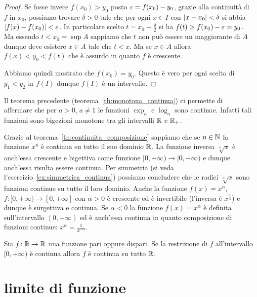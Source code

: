 \begin{proof}
  Se fosse invece $f(x_0)>y_0$ posto $\varepsilon = f(x_0)-y_0$,
  grazie alla continuità di $f$ in $x_0$,
  possiamo trovare $\delta>0$ tale che per ogni $x\in I$
  con ${\left|x-x_0\right|}<\delta$ si abbia ${\left|f(x)-f(x_0)\right|}<\varepsilon$.
  In particolare scelto $t = x_0 - \frac \delta 2$
  si ha $f(t) > f(x_0)-\varepsilon = y_0$. 
  Ma essendo $t<x_0 = \sup A$ sappiamo che $t$ non può essere 
  un maggiorante di $A$ dunque deve esistere $x\in A$
  tale che $t<x$. 
  Ma se $x\in A$ allora $f(x) < y_0 < f(t)$
  che è assurdo in quanto $f$ è crescente.
  
  Abbiamo quindi mostrato che $f(x_0)=y_0$. 
  Questo è vero per ogni scelta di $y_1<y_2$ in $f(I)$
  dunque $f(I)$ è un intervallo.
  \end{proof}
  
  Il teorema precedente (teorema~\ref{th:monotona_continua}) ci permette di affermare che per $a>0$, $a\neq 1$ 
  le funzioni 
  $\exp_a$ e $\log_a$ sono continue. 
  Infatti tali funzioni sono bigezioni monotone tra 
  gli intervalli ${\mathbb R}$ e ${\mathbb R}_+$.
  
  Grazie al teorema~\ref{th:continuita_composizione} sappiamo 
  che se $n\in {\mathbb N}$ la funzione $x^n$ è continua su tutto il suo 
  dominio ${\mathbb R}$. 
  La funzione inversa $\sqrt[n]{x}$ è anch'essa crescente e 
  bigettiva come funzione $[0,+\infty)\to[0,+\infty)$ e dunque 
  anch'essa risulta essere continua.
  Per simmetria (si veda l'esercizio~\ref{ex:simmetrica_continua}) 
  possiamo concludere 
  che le radici $\sqrt[n]{x}$ sono 
  funzioni continue su tutto il loro dominio.
  Anche la funzione $f(x) = x^\alpha$, $f\colon [0,+\infty)\to [0,+\infty]$ 
  con $\alpha>0$ è crescente ed è invertibile (l'inversa è $x^{\frac 1 \alpha}$)
  e dunque è surgettiva e continua.
  Se $\alpha<0$ la funzione $f(x)=x^\alpha$ è definita sull'intervallo 
  $(0,+\infty)$ ed è anch'essa continua in quanto 
  composizione di funzioni continue: $x^{\alpha} = \frac{1}{x^{-\alpha}}$.
  
  \begin{exercise}\label{ex:simmetrica_continua}
    Sia $f\colon {\mathbb R}\to {\mathbb R}$ una funzione pari oppure dispari.
    Se la restrizione di $f$ all'intervallo $[0,+\infty)$ 
    è continua allora $f$ è continua su tutto ${\mathbb R}$.
  \end{exercise}
  
  \section{limite di funzione}


